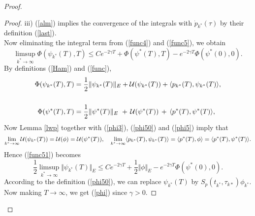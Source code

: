 \documentclass[11pt]{article}
\newcommand{\fr}{\frac}
\newcommand{\cU}{{\cal U}}
\newcommand{\ga}{\gamma}
\newcommand{\5}{{\hspace{0.5mm}}}
\numberwithin{equation}{section}
\newcommand{\la}{\label}
\newcommand{\be}{\begin{equation}}
\newcommand{\ee}{\end{equation}}
\numberwithin{equation}{section}
\begin{document}
\begin{proof}
\begin{proof}
 iii) (\ref{alm}) implies the convergence of the integrals with
 $\dot p_{k^*}(\tau)$ by their definition (\ref{last}).
 \smallskip\\
 Now eliminating the integral term from (\ref{func4}) and (\ref{func5}), we obtain
\be\la{func51}
\limsup_{k^*\to\infty} \Phi(\psi_{k^*}(T),T)\le C e^{-2\ga T}+\Phi(\psi^*(T),T)-e^{-2\ga T}\Phi(\psi^*(0),0).
\ee
By definitions (\ref{Ham}) and (\ref{func}),
\begin{align}
\Phi(\psi_{k^*}(T),T)&=\fr12 \Vert \psi_{k^*}(T) \Vert_E
+\cU(\psi_{k^*}(T))+\langle p_{k^*}(T),\psi_{k^*}(T) \rangle,
\nonumber\\\nonumber\\
\Phi(\psi^*(T),T)&=\fr12 \Vert \psi^*(T) \Vert_E
\,\,+\,\cU(\psi^*(T))\,+\,\langle p^*(T),\psi^*(T) \rangle,
\nonumber
\end{align}
Now Lemma \ref{lwp} together with (\ref{phi3}), (\ref{phi50}) and (\ref{phi5}) imply that
$$
\lim_{k^*\to\infty} \cU(\psi_{k^*}(T))=\cU(\phi)=\cU(\psi^*(T)),
\quad \lim_{k^*\to\infty} \langle p_{k^*}(T),\psi_{k^*}(T) \rangle= \langle p^*(T),\phi\rangle=\langle p^*(T),\psi^*(T)\rangle.
$$
Hence (\ref{func51}) becomes
$$
\fr12\limsup_{k^*\to\infty} \Vert \psi_{k^*}(T) \Vert_E
\le C e^{-2\ga T}+
\fr12\Vert\phi\Vert_E
-e^{-2\ga T}\Phi(\psi^*(0),0).
$$
According to the definition (\ref{phi50}), we can replace $\psi_{k^*}(T)$ by $S_p(t_{k^*},\tau_{k*})\phi_{k^*}$. Now making 
 $T\to\infty$, we get (\ref{phi}) since $\ga>0$.
 \end{proof}

\end{proof}
\end{document}
